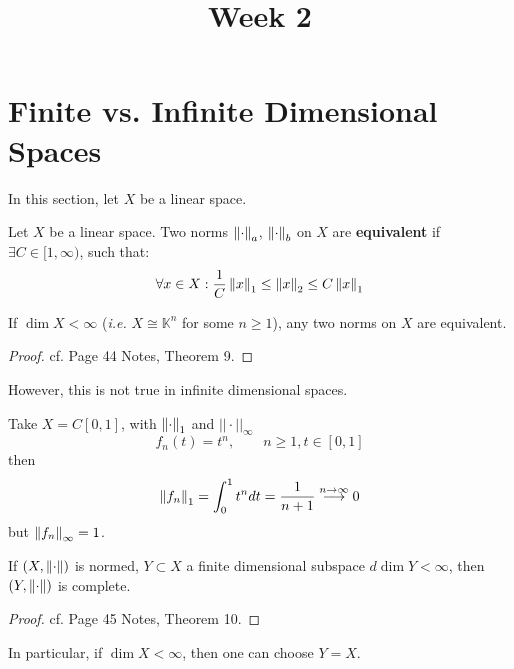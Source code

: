 \documentclass{article}
\title{Week 2}
\begin{document}
\maketitle

\section{Finite vs. Infinite Dimensional Spaces}

In this section, let $X$ be a linear space.  

\begin{definition}\label{equivalent norms}\rm\nextline
	Let $X$ be a linear space. Two norms $\left\|{\cdot}\right\|_a$, $\left\|{\cdot}\right\|_b$ on $X$ are {\bf equivalent} if $\exists C \in [1, \infty)$, such that:
 $$
    \forall x \in X: \frac{1}{C}\left\|{x}\right\|_1 \leq \left\|{x}\right\|_2 \leq C \left\|{x}\right\|_1
 $$
\end{definition}

\begin{proposition}
    If $\dim X < \infty$ (\textit{i.e.} $X \cong \mathbb{K}^n$ for some $n \geq 1$), any two norms on $X$ are equivalent.
\end{proposition}
\begin{proof}
    cf. Page 44 Notes, Theorem 9.
\end{proof}

However, this is not true in infinite dimensional spaces.  

\begin{example}
    Take $X = C[0,1]$, with $\left\|{\cdot}\right\|_1$ and $||\cdot||_{\infty}$
    $$
    f_n(t) = t^n, \qquad n \geq 1, t\in [0,1]
    $$
    then  
    $$
    \left\|{f_n}\right\|_1 = \int_0^1 t^n dt = \frac{1}{n+1} \overset{n \to \infty}{\longrightarrow} 0
    $$
    but $\left\|{f_n}\right\|_{\infty}=1$.
\end{example}

\begin{proposition}
\label{finite dim is complete}
    If $(X, \left\|{\cdot}\right\|)$ is normed, $Y \subset X$ a finite dimensional subspace $d\dim Y < \infty$, then $(Y, \left\|{\cdot}\right\|)$ is complete.
\end{proposition}  
\begin{proof}
    cf. Page 45 Notes, Theorem 10.
\end{proof}

\begin{remark}
In particular, if $\dim X < \infty$, then one can choose $Y=X$. 
\end{remark}  
\end{document}
